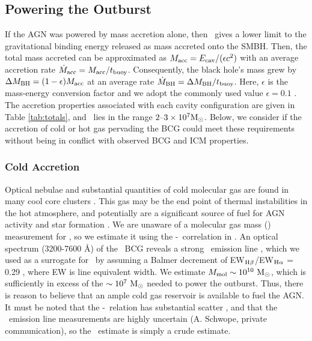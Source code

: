 \documentclass[apjpt4]{aastex}
\begin{document}
\subsection{Powering the Outburst}
\label{sec:accretion}

If the AGN was powered by mass accretion alone, then \ecav\ gives a
lower limit to the gravitational binding energy released as mass
accreted onto the SMBH. Then, the total mass accreted can be
approximated as $M_{\rm{acc}} = E_{\rm{cav}}/(\epsilon c^2)$ with an average
accretion rate $\dot{M}_{\rm{acc}} = M_{\rm{acc}}/t_{\rm{buoy}}$. Consequently, the black hole's
mass grew by $\Delta M_{\rm{BH}} = (1-\epsilon)M_{\rm{acc}}$ at an average rate $\dot{M}_{\rm{BH}} =
\Delta M_{\rm{BH}}/t_{\rm{buoy}}$. Here, $\epsilon$ is the mass-energy conversion factor
and we adopt the commonly used value $\epsilon = 0.1$
\citep{2002apa..book.....F}. The accretion properties associated with
each cavity configuration are given in Table \ref{tab:totals}, and
\macc\ lies in the range $2 \mbox{--} 3 \times 10^7 \rm{M_{\odot}}$. Below, we
consider if the accretion of cold or hot gas pervading the BCG could
meet these requirements without being in conflict with observed BCG
and ICM properties.

\subsubsection{Cold Accretion}
\label{sec:cold}

Optical nebulae and substantial quantities of cold molecular gas are
found in many cool core clusters \citep{crawford99, edge01}. This gas
may be the end point of thermal instabilities in the hot atmosphere,
and potentially are a significant source of fuel for AGN activity and
star formation \citep[\eg][]{pizzolato05, 2006NewA...12...38S,
  2010MNRAS.408..961P}. We are unaware of a molecular gas mass (\mmol)
measurement for \rbs, so we estimate it using the
\mmol-\halpha\ correlation in \citet{edge01}. An optical spectrum
(3200-7600 \AA) of the \rbs\ BCG reveals a strong \hbeta\ emission
line \citep{rbs1, rbs2}, which we used as a surrogate for \halpha\ by
assuming a Balmer decrement of EW$_{\rm{H}\beta}$/EW$_{\rm{H}\alpha}$ = 0.29
\citep{2006ApJ...642..775M}, where EW is line equivalent width. We
estimate $M_{\rm{mol}} \sim 10^{10} ~\rm{M_{\odot}}$, which is sufficiently in excess
of the $\sim 10^7 ~\rm{M_{\odot}}$ needed to power the outburst. Thus, there is
reason to believe that an ample cold gas reservoir is available to
fuel the AGN. It must be noted that the \mmol-\halpha\ relation has
substantial scatter \citep{salome03}, and that the \rbs\ emission line
measurements are highly uncertain (A. Schwope, private communication),
so the \mmol\ estimate is simply a crude estimate.
\end{document}
